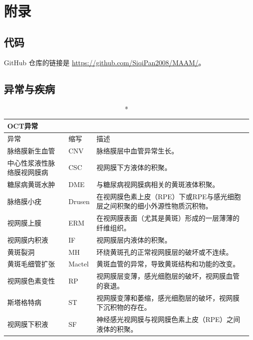 \documentclass{article}
\begin{document}
	\pagebreak
	\newrefcontext[sorting=nyt]
	\begin{multicols}{2}
	\printbibliography
	\end{multicols}
	
	
	\pagebreak
	\section*{附录}
	
	\subsection*{代码}
	
	GitHub 仓库的链接是 \url{https://github.com/SiqiPan2008/MAAM/}。
	
	\subsection*{异常与疾病}
	
	{
		\fontsize{9}{12}\selectfont
		{
			\begin{longtable}{llp{9.5cm}}
				\caption*{OCT异常}
				\label{tb:oct-abnormites}\\
				\toprule
				异常&缩写&描述\\
				\toprule
				
				脉络膜新生血管
				& CNV
				& 脉络膜层中血管异常生长。\\
				
				中心性浆液性脉络膜视网膜病
				& CSC
				& 视网膜下方液体的积聚。\\
				
				糖尿病黄斑水肿
				& DME
				& 与糖尿病视网膜病相关的黄斑液体积聚。\\
				
				脉络膜小疣
				& Drusen
				& 在视网膜色素上皮（RPE）下或RPE与感光细胞层之间积聚的细小外源性物质沉积物。\\
				
				视网膜上膜
				& ERM
				& 在视网膜表面（尤其是黄斑）形成的一层薄薄的纤维组织。\\
				
				视网膜内积液
				& IF
				& 视网膜层内液体的积聚。\\
				
				黄斑裂洞
				& MH
				& 环绕黄斑孔的正常视网膜层的破坏或不连续。\\
				
				黄斑毛细管扩张
				& Mactel
				& 黄斑血管的异常，导致黄斑结构和功能的改变。\\
				
				视网膜色素变性
				& RP
				& 视网膜层变薄，感光细胞层的破坏，视网膜血管的衰退。\\
				
				斯塔格特病
				& ST
				& 视网膜变薄和萎缩，感光细胞层的破坏，视网膜下沉积物的存在。\\
				
				视网膜下积液
				& SF
				& 神经感光视网膜与视网膜色素上皮（RPE）之间液体的积聚。\\
				
				\bottomrule
			\end{longtable}
		}
	}
	
\end{document}
